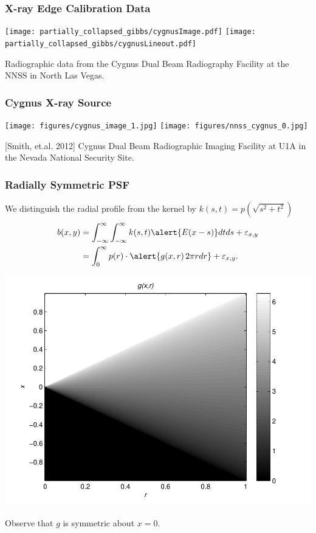 \documentclass[]{beamer}
\newcommand{\eps}{\varepsilon}
\begin{document}
\begin{frame}
  \frametitle{X-ray Edge Calibration Data}
  \texttt{[image: partially\_collapsed\_gibbs/cygnusImage.pdf]}
  \texttt{[image: partially\_collapsed\_gibbs/cygnusLineout.pdf]}

  {\small Radiographic data from the Cygnus Dual Beam Radiography Facility at the NNSS in North Las Vegas.}
\end{frame}

\begin{frame}
  \frametitle{Cygnus X-ray Source}
  \texttt{[image: figures/cygnus\_image\_1.jpg]}
  \texttt{[image: figures/nnss\_cygnus\_0.jpg]} 

  [Smith, et.al. 2012] Cygnus Dual Beam Radiographic Imaging Facility at U1A in the Nevada National Security Site.
\end{frame}

\begin{frame}[t]
  \frametitle{Radially Symmetric PSF}
  \vspace{-.5em}
  {\small
  We distinguish the \alert{radial profile} from the kernel by \alert{$k(s,t) = p\left(\sqrt{s^2+t^2}\right)$}%
  \begin{align*}
    b(x,y) 
     &= \int_{-\infty}^\infty\int_{-\infty}^\infty k(s,t)\alert{E(x-s)}dtds + \eps_{x,y}\\
     &= \int_0^\infty p(r) \cdot \alert{g(x,r)\,2\pi r dr} + \eps_{x,y}.
  \end{align*}

  \begin{center}
  \includegraphics[width=.5\textwidth]{figures/g_function.pdf}

  Observe that $g$ is symmetric about $x=0$.
  \end{center}
  }
\end{frame}
\end{document}

